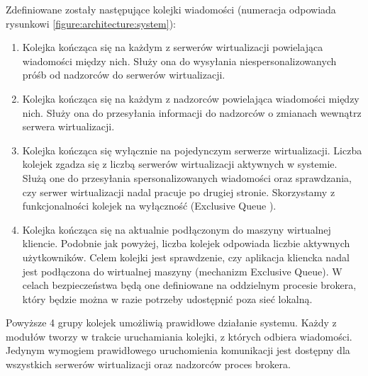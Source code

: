 \documentclass[../opis-rozwiazania.tex]{subfiles}
\begin{document}
Zdefiniowane zostały następujące kolejki wiadomości (numeracja odpowiada rysunkowi \ref{figure:architecture:system}):
\begin{enumerate}[label=(\Roman*)]
  \item \label{modules:broker:queue-virtsrv} Kolejka kończąca się na każdym z serwerów wirtualizacji powielająca wiadomości między nich.
        Służy ona do wysyłania niespersonalizowanych próśb od nadzorców do serwerów wirtualizacji.
  \item \label{modules:broker:queue-overseers} Kolejka kończąca się na każdym z nadzorców powielająca wiadomości między nich.
        Służy ona do przesyłania informacji do nadzorców o zmianach wewnątrz serwera wirtualizacji.
  \item \label{modules:broker:queue-exclusive} Kolejka kończąca się wyłącznie na pojedynczym serwerze wirtualizacji.
        Liczba kolejek zgadza się z liczbą serwerów wirtualizacji aktywnych w systemie.
        Służą one do przesyłania spersonalizowanych wiadomości oraz sprawdzania, czy serwer wirtualizacji nadal pracuje po drugiej stronie.
        Skorzystamy z funkcjonalności kolejek na wyłączność (Exclusive Queue \parencite{xrdp-clients}).
  \item \label{modules:broker:queue-users} Kolejka kończąca się na aktualnie podłączonym do maszyny wirtualnej kliencie.
        Podobnie jak powyżej, liczba kolejek odpowiada liczbie aktywnych użytkowników.
        Celem kolejki jest sprawdzenie, czy aplikacja kliencka nadal jest podłączona do wirtualnej maszyny (mechanizm Exclusive Queue).
        W celach bezpieczeństwa będą one definiowane na oddzielnym procesie brokera, który będzie można w razie potrzeby udostępnić poza sieć lokalną.
\end{enumerate}

Powyższe 4 grupy kolejek umożliwią prawidłowe działanie systemu.
Każdy z modułów tworzy w trakcie uruchamiania kolejki, z których odbiera wiadomości.
Jedynym wymogiem prawidłowego uruchomienia komunikacji jest dostępny dla wszystkich serwerów wirtualizacji oraz nadzorców proces brokera.

\end{document}

